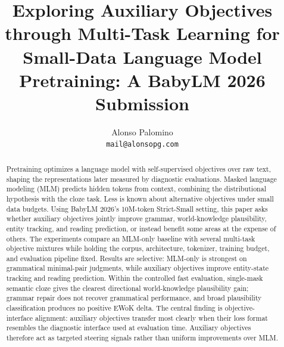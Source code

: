 \documentclass[11pt]{article}
\title{Exploring Auxiliary Objectives through Multi-Task Learning for Small-Data Language Model Pretraining: A BabyLM 2026 Submission}
\author{
  Alonso Palomino \\
  \texttt{mail@alonsopg.com}
}
\begin{document}
\maketitle

\begin{abstract}
Pretraining optimizes a language model with self-supervised objectives over raw text, shaping the representations later measured by diagnostic evaluations.
Masked language modeling (MLM) predicts hidden tokens from context, combining the distributional hypothesis with the cloze task.
Less is known about alternative objectives under small data budgets.
Using BabyLM 2026's 10M-token Strict-Small setting, this paper asks whether auxiliary objectives jointly improve grammar, world-knowledge plausibility, entity tracking, and reading prediction, or instead benefit some areas at the expense of others.
The experiments compare an MLM-only baseline with several multi-task objective mixtures while holding the corpus, architecture, tokenizer, training budget, and evaluation pipeline fixed.
Results are selective: MLM-only is strongest on grammatical minimal-pair judgments, while auxiliary objectives improve entity-state tracking and reading prediction.
Within the controlled fast evaluation, single-mask semantic cloze gives the clearest directional world-knowledge plausibility gain; grammar repair does not recover grammatical performance, and broad plausibility classification produces no positive EWoK delta.
The central finding is objective-interface alignment: auxiliary objectives transfer most clearly when their loss format resembles the diagnostic interface used at evaluation time.
Auxiliary objectives therefore act as targeted steering signals rather than uniform improvements over MLM.
\end{abstract}
\end{document}
